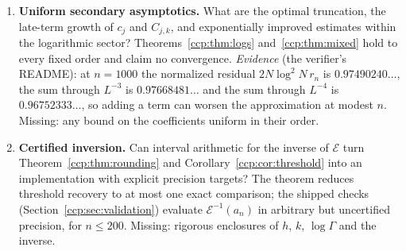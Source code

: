 \documentclass[11pt,letterpaper]{article}
\theoremstyle{remark}\newtheorem{remark}[theorem]{Remark}
\newcommand{\norm}[1]{\lVert #1\rVert}
\begin{document}
\begin{enumerate}
$T^n1=h^nP1+T^n(1-P)1$ with the two terms orthogonal, and
$\norm{T^n(1-P)1}^2=\langle1,T^{2n}1\rangle-h^{2n}\norm{P1}^2
=2b_{2n}-2kh^{2n}=2r_{2n}$ by \eqref{ccp:eq:moments}, $\norm{P1}^2=2k$
(the atom of \eqref{ccp:eq:measure}) and \eqref{ccp:eq:spectral}; the
asymptotic is \eqref{ccp:eq:equivalents}. In particular the distance is at
most $\sqrt{1-2k}<0.57$ for every $n$ (by \eqref{ccp:eq:mass}) and tends
to $0$. Lemma~\ref{ccp:lem:bernstein} identifies $T^n1$ with the Bernstein
sum. $\square$ (Dated note, 5~October 2026: the first version of this
question stated only a bound. Its display ended in ``$\le1$'' where the
identity and its asymptotic now stand, and its proof ended ``Hence the
restriction has norm at most $1$, and $T^n1=h^nP1+T^n(1-P)1$ with
$\norm{T^n(1-P)1}\le\norm{(1-P)1}\le1$'', followed by the remark
``Consistently, $\norm{P1}^2=2k$ is the atom of \eqref{ccp:eq:measure}''.
An independent check made by the intake after the write found that bound
valid but far from sharp and supplied the exact identity, in which the
remark has become a step of the proof; see the end of this section.)
Missing: passing from this $L^2$ statement about
Bernstein-smoothed rows to the coefficients $P_{n,p}$ themselves, which
needs a separate coefficient analysis, and the boundary behaviour.

\item\label{ccp:q:uniform} \textbf{Uniform secondary asymptotics.} What
are the optimal truncation, the late-term growth of $c_j$ and $C_{j,k}$, and
exponentially improved estimates within the logarithmic sector?
Theorems~\ref{ccp:thm:logs} and~\ref{ccp:thm:mixed} hold to every fixed
order and claim no convergence. \emph{Evidence} (the verifier's README):
at $n=1000$ the normalized residual $2N\log^2N\,r_n$ is
$0.97490240\ldots$, the sum through $L^{-3}$ is $0.97668481\ldots$ and the
sum through $L^{-4}$ is $0.96752333\ldots$, so adding a term can worsen the
approximation at modest $n$. Missing: any bound on the coefficients
uniform in their order.

\item\label{ccp:q:certified} \textbf{Certified inversion.} Can interval
arithmetic for the inverse of $\mathcal E$ turn
Theorem~\ref{ccp:thm:rounding} and Corollary~\ref{ccp:cor:threshold} into an
implementation with explicit precision targets? The theorem reduces
threshold recovery to at most one exact comparison; the shipped checks
(Section~\ref{ccp:sec:validation}) evaluate $\mathcal E^{-1}(a_n)$ in
arbitrary but uncertified precision, for $n\le200$. Missing: rigorous
enclosures of $h$, $k$, $\log\Gamma$ and the inverse.


\end{enumerate}
\end{document}
